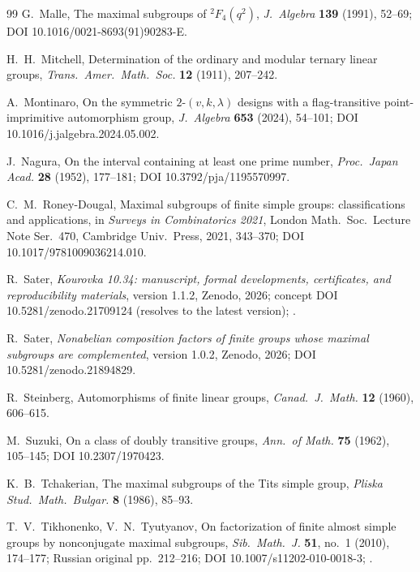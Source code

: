 \documentclass[11pt]{amsart}
\theoremstyle{definition}
\theoremstyle{remark}
\begin{document}
\begin{thebibliography}{99}
G.~Malle, The maximal subgroups of ${}^2F_4(q^2)$,
\emph{J.\ Algebra} \textbf{139} (1991), 52--69;
DOI 10.1016/0021-8693(91)90283-E.

H.~H.~Mitchell, Determination of the ordinary and modular ternary
linear groups, \emph{Trans.\ Amer.\ Math.\ Soc.} \textbf{12} (1911),
207--242.

A.~Montinaro, On the symmetric $2$-$(v,k,\lambda)$ designs with a
flag-transitive point-imprimitive automorphism group,
\emph{J.\ Algebra} \textbf{653} (2024), 54--101;
DOI 10.1016/j.jalgebra.2024.05.002.

J.~Nagura, On the interval containing at least one prime number,
\emph{Proc.\ Japan Acad.} \textbf{28} (1952), 177--181;
DOI 10.3792/pja/1195570997.

C.~M.~Roney-Dougal, Maximal subgroups of finite simple groups:
classifications and applications, in \emph{Surveys in Combinatorics
2021}, London Math.\ Soc.\ Lecture Note Ser.\ 470, Cambridge Univ.\ Press,
2021, 343--370; DOI 10.1017/9781009036214.010.

R.~Sater, \emph{Kourovka 10.34: manuscript, formal developments,
certificates, and reproducibility materials}, version 1.1.2, Zenodo, 2026;
concept DOI 10.5281/zenodo.21709124 (resolves to the latest version);
.

R.~Sater, \emph{Nonabelian composition factors of finite groups whose
maximal subgroups are complemented}, version 1.0.2, Zenodo, 2026;
DOI 10.5281/zenodo.21894829.

R.~Steinberg, Automorphisms of finite linear groups,
\emph{Canad.\ J.\ Math.} \textbf{12} (1960), 606--615.

M.~Suzuki, On a class of doubly transitive groups,
\emph{Ann.\ of Math.} \textbf{75} (1962), 105--145;
DOI 10.2307/1970423.

K.~B.~Tchakerian, The maximal subgroups of the Tits simple group,
\emph{Pliska Stud.\ Math.\ Bulgar.} \textbf{8} (1986), 85--93.

T.~V.~Tikhonenko, V.~N.~Tyutyanov, On factorization of finite almost
simple groups by nonconjugate maximal subgroups, \emph{Sib.\ Math.\ J.}
\textbf{51}, no.~1 (2010), 174--177; Russian original pp.~212--216;
DOI 10.1007/s11202-010-0018-3; .


\end{thebibliography}
\end{document}
